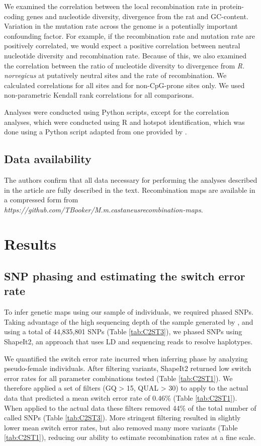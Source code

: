 We examined the correlation between the local recombination rate in protein-coding genes and nucleotide diversity, divergence from the rat and GC-content. Variation in the mutation rate across the genome is a potentially important confounding factor. For example, if the recombination rate and mutation rate are positively correlated, we would expect a positive correlation between neutral nucleotide diversity and recombination rate. Because of this, we also examined the correlation between the ratio of nucleotide diversity to divergence from \textit{R. norvegicus} at putatively neutral sites and the rate of recombination. We calculated correlations for all sites and for non-CpG-prone sites only. We used non-parametric Kendall rank correlations for all comparisons.

Analyses were conducted using Python scripts, except for the correlation analyses, which were conducted using R \citep{RN666} and hotspot identification, which was done using a Python script adapted from one provided by \cite{RN258}. 

\subsection{Data availability}

	The authors confirm that all data necessary for performing the analyses described in the article are fully described in the text. Recombination maps are available in a compressed form from \textit{https://github.com/TBooker/M.m.castaneus\textunderscore recombination-maps}.

\section{Results}
 
\subsection{SNP phasing and estimating the switch error rate}
 
To infer genetic maps using our sample of individuals, we required phased SNPs. Taking advantage of the high sequencing depth of the sample generated by \cite{RN122}, and using a total of 44,835,801 SNPs (Table \ref{tab:C2ST3}), we phased SNPs using ShapeIt2, an approach that uses LD and sequencing reads to resolve haplotypes. 
 
We quantified the switch error rate incurred when inferring phase by analyzing pseudo-female individuals. After filtering variants, ShapeIt2 returned low switch error rates for all parameter combinations tested (Table \ref{tab:C2ST1}). We therefore applied a set of filters (GQ > 15, QUAL > 30) to apply to the actual data that predicted a mean switch error rate of 0.46\% (Table \ref{tab:C2ST1}). When applied to the actual data these filters removed 44\% of the total number of called SNPs (Table \ref{tab:C2ST3}). More stringent filtering resulted in slightly lower mean switch error rates, but also removed many more variants (Table \ref{tab:C2ST1}), reducing our ability to estimate recombination rates at a fine scale.
 
